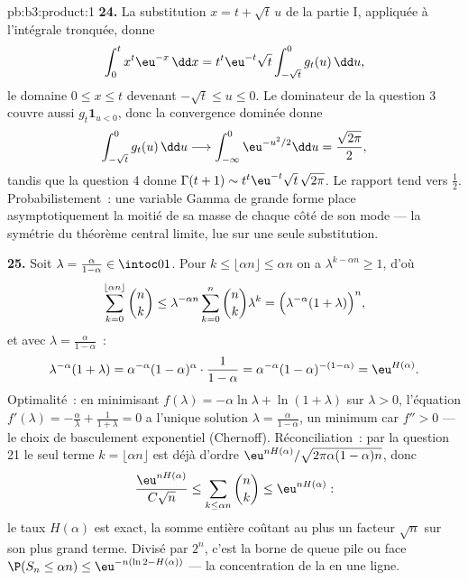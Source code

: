 \begin{solution}{pb:b3:product:1}
\textbf{24.} La substitution $x = t + \sqrt t\,u$ de la
partie I, appliquée à l'intégrale tronquée, donne
\[
\int_0^{t} x^{t}\eu^{-x}\,\dd x
= t^{t}\eu^{-t}\sqrt t\int_{-\sqrt t}^{0} g_t(u)\,\dd u ,
\]
le domaine $0 \leq x \leq t$ devenant $-\sqrt t \leq u \leq
0$. Le dominateur de la question 3 couvre aussi $g_t\mathbf
1_{u < 0}$, donc la convergence dominée donne
\[
\int_{-\sqrt t}^{0}g_t(u)\,\dd u \longrightarrow
\int_{-\infty}^{0}\eu^{-u^2/2}\dd u = \frac{\sqrt{2\pi}}2 ,
\]
tandis que la question 4 donne $\Gamma(t+1) \sim
t^t\eu^{-t}\sqrt t\,\sqrt{2\pi}$. Le rapport tend vers
$\frac12$. Probabilistement~: une variable Gamma de grande
forme place asymptotiquement la moitié de sa masse de chaque
côté de son mode --- la symétrie du théorème central limite,
lue sur une seule substitution.

\textbf{25.} Soit $\lambda = \frac{\alpha}{1-\alpha} \in
\intoc01$. Pour $k \leq \lfloor\alpha n\rfloor \leq \alpha
n$ on a $\lambda^{k - \alpha n} \geq 1$, d'où
\[
\sum_{k=0}^{\lfloor\alpha n\rfloor}\binom nk
\leq \lambda^{-\alpha n}\sum_{k=0}^{n}\binom nk\lambda^{k}
= \Bigl(\lambda^{-\alpha}(1 + \lambda)\Bigr)^{n},
\]
et avec $\lambda = \frac\alpha{1-\alpha}$~:
\[
\lambda^{-\alpha}(1+\lambda)
= \alpha^{-\alpha}(1-\alpha)^{\alpha}\cdot\frac1{1-\alpha}
= \alpha^{-\alpha}(1-\alpha)^{-(1-\alpha)}
= \eu^{H(\alpha)} .
\]
Optimalité~: en minimisant $f(\lambda) = -\alpha\ln\lambda +
\ln(1+\lambda)$ sur $\lambda > 0$, l'équation $f'(\lambda)
= -\frac\alpha\lambda + \frac1{1+\lambda} = 0$ a l'unique
solution $\lambda = \frac\alpha{1-\alpha}$, un minimum car
$f'' > 0$ --- le choix de basculement exponentiel
(Chernoff). Réconciliation~: par la question 21 le seul
terme $k = \lfloor\alpha n\rfloor$ est déjà d'ordre
$\eu^{nH(\alpha)}/\sqrt{2\pi\alpha(1-\alpha)n}$, donc
\[
\frac{\eu^{nH(\alpha)}}{C\sqrt n} \leq
\sum_{k\leq\alpha n}\binom nk \leq \eu^{nH(\alpha)} :
\]
le taux $H(\alpha)$ est exact, la somme entière coûtant au
plus un facteur $\sqrt n$ sur son plus grand terme. Divisé
par $2^n$, c'est la borne de queue pile ou face $\P(S_n
\leq \alpha n) \leq \eu^{-n(\ln2 - H(\alpha))}$ --- la
concentration de la  en une ligne.
\end{solution}
